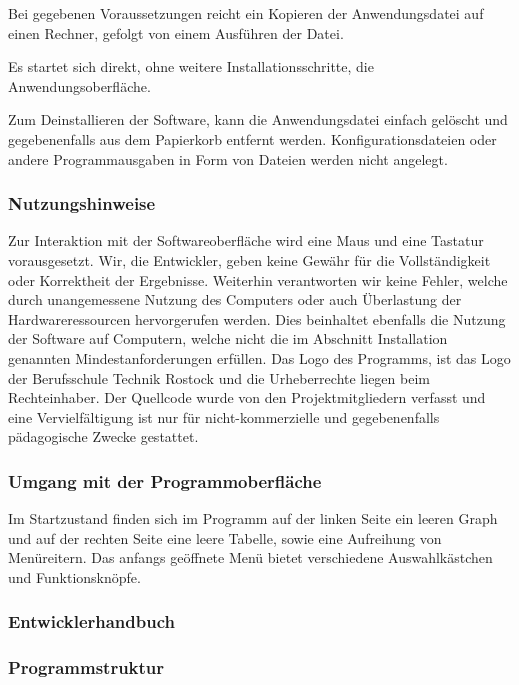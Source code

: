 \documentclass[a4paper]{article}
\begin{document}
    Bei gegebenen Voraussetzungen reicht ein Kopieren der Anwendungsdatei auf einen Rechner, gefolgt von einem Ausführen der Datei.

    Es startet sich direkt, ohne weitere Installationsschritte, die Anwendungsoberfläche.

    Zum Deinstallieren der Software, kann die Anwendungsdatei einfach gelöscht und gegebenenfalls aus dem Papierkorb entfernt werden.
    Konfigurationsdateien oder andere Programmausgaben in Form von Dateien werden nicht angelegt.

    \subsubsection{Nutzungshinweise}
    
    Zur Interaktion mit der Softwareoberfläche wird eine Maus und eine Tastatur vorausgesetzt.
    Wir, die Entwickler, geben keine Gewähr für die Vollständigkeit oder Korrektheit der Ergebnisse.
    Weiterhin verantworten wir keine Fehler, welche durch unangemessene Nutzung des Computers oder auch Überlastung der Hardwareressourcen hervorgerufen werden.
    Dies beinhaltet ebenfalls die Nutzung der Software auf Computern, welche nicht die im Abschnitt Installation genannten Mindestanforderungen erfüllen.
    Das Logo des Programms, ist das Logo der Berufsschule Technik Rostock und die Urheberrechte liegen beim Rechteinhaber.
    Der Quellcode wurde von den Projektmitgliedern verfasst und eine Vervielfältigung ist nur für nicht-kommerzielle und gegebenenfalls pädagogische Zwecke gestattet.

    \subsubsection{Umgang mit der Programmoberfläche}
    
    Im Startzustand finden sich im Programm auf der linken Seite ein leeren Graph und auf der rechten Seite eine leere Tabelle, sowie eine Aufreihung von Menüreitern.
    Das anfangs geöffnete Menü bietet verschiedene Auswahlkästchen und Funktionsknöpfe.
    

\subsubsection{Entwicklerhandbuch}
    \subsubsection{Programmstruktur}
    
\end{document}
